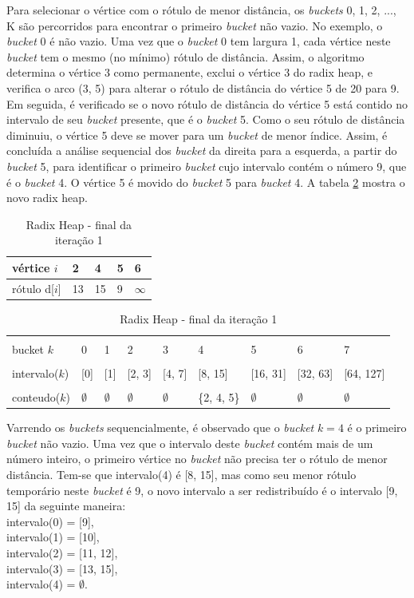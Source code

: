 Para selecionar o vértice com o rótulo de menor distância, os \textit{buckets} 0, 1, 2, ..., K são percorridos para encontrar o
primeiro \textit{bucket} não vazio. No exemplo, o \textit{bucket} 0 é não vazio. Uma vez que o \textit{bucket} 0 tem largura 1,
cada vértice neste \textit{bucket} tem o mesmo (no mínimo) rótulo de distância. Assim, o algoritmo determina o vértice 3 como permanente,
exclui o vértice 3 do radix heap, e verifica o arco (3, 5) para alterar o rótulo de distância do vértice 5 de 20 para 9.
Em seguida, é verificado se o novo rótulo de distância do vértice 5 está contido no intervalo de seu \textit{bucket} presente,
que é o \textit{bucket} 5. Como o seu rótulo de distância diminuiu, o vértice 5 deve se mover para um \textit{bucket} de menor índice.
Assim, é concluída a análise sequencial dos \textit{bucket} da direita para a esquerda, a partir do \textit{bucket} 5,
para identificar o primeiro \textit{bucket} cujo intervalo contém o número 9, que é o \textit{bucket} 4.
O vértice 5 é movido do \textit{bucket} 5 para \textit{bucket} 4. A tabela \ref{tab:secondradixheap} mostra o novo radix heap.

\begin{table}[htbp]
	\centering
	\begin{tabular}{l l l l l}
	\toprule
	vértice $i$ & 2 & 4 & 5 & 6\\
	\midrule
	rótulo d[$i$] & 13 & 15 & 9 & $\infty$ \\
	\bottomrule
	\end{tabular}
	
	\centering
	\begin{tabular}{l l l l l l l l l}
	\toprule
	\\bucket $k$ & 0 & 1 & 2 & 3 & 4 & 5 & 6 & 7\\
	\midrule
	\\intervalo($k$) & [0] & [1] & [2, 3] & [4, 7] & [8, 15] & [16, 31] & [32, 63] & [64, 127]\\
	\\conteudo($k$) & $\emptyset$ & $\emptyset$ & $\emptyset$ & $\emptyset$ & \{2, 4, 5\} & $\emptyset$ & $\emptyset$ & $\emptyset$\\
	\bottomrule
	\end{tabular}
\caption{Radix Heap - final da iteração 1}
 \label{tab:secondradixheap}
\end{table}
\FloatBarrier
Varrendo os \textit{buckets} sequencialmente, é observado que o \textit{bucket} $k = 4$ é o primeiro \textit{bucket} não vazio.
Uma vez que o intervalo deste \textit{bucket} contém mais de um número inteiro, o primeiro vértice no \textit{bucket} não precisa ter
o rótulo de menor distância. Tem-se que intervalo(4) é [8, 15], mas como seu menor rótulo temporário neste \textit{bucket} é 9,
o novo intervalo a ser redistribuído é o intervalo [9, 15] da seguinte maneira:\\
intervalo(0) = [9],\\
intervalo(1) = [10],\\
intervalo(2) = [11, 12],\\
intervalo(3) = [13, 15],\\
intervalo(4) = $\emptyset$.

